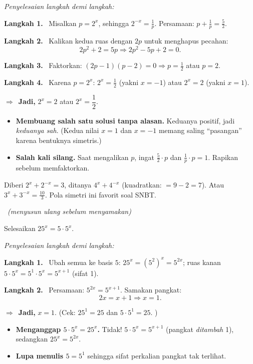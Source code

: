 \documentclass[11pt,a4paper]{report}
\theoremstyle{gaya}
\newcommand{\jawab}{\par\smallskip\noindent\textit{\textcolor{oranye}{Penyelesaian langkah demi langkah:}}\par\smallskip}
\newcommand{\langkah}[1]{\par\smallskip\noindent\textbf{\textcolor{biru}{Langkah #1.}}\ }
\newcommand{\jadi}{\par\smallskip\noindent$\Rightarrow$\ \textbf{Jadi, }}
\newcommand{\soalno}[2]{%
  \par\bigskip
  \noindent{\large\bfseries\color{ungu}\rule[-2pt]{4pt}{14pt}\ Soal #1}%
  \ {\normalfont\itshape\color{gray}(#2)}\par\nopagebreak\smallskip}
\begin{document}
\jawab
\langkah{1} Misalkan $p=2^x$, sehingga $2^{-x}=\tfrac1p$. Persamaan:
$p+\tfrac1p = \tfrac52$.
\langkah{2} Kalikan kedua ruas dengan $2p$ untuk menghapus pecahan:
\[
2p^2 + 2 = 5p \Rightarrow 2p^2 - 5p + 2 = 0.
\]
\langkah{3} Faktorkan: $(2p-1)(p-2)=0 \Rightarrow p=\tfrac12$ atau $p=2$.
\langkah{4} Karena $p=2^x$: $2^x=\tfrac12$ (yakni $x=-1$) atau $2^x=2$ (yakni
$x=1$).
\jadi $2^x = 2$ atau $2^x=\dfrac12$.

\begin{jebakan}
\begin{itemize}[leftmargin=*,topsep=2pt]
  \item \textbf{Membuang salah satu solusi tanpa alasan.} Keduanya positif, jadi
  \emph{keduanya sah}. (Kedua nilai $x=1$ dan $x=-1$ memang saling ``pasangan''
  karena bentuknya simetris.)
  \item \textbf{Salah kali silang.} Saat mengalikan $p$, ingat $\frac52\cdot p$
  dan $\frac1p\cdot p=1$. Rapikan sebelum memfaktorkan.
\end{itemize}
\end{jebakan}

\begin{variasi}
Diberi $2^x+2^{-x}=3$, ditanya $4^x+4^{-x}$ (kuadratkan: $=9-2=7$). Atau
$3^x+3^{-x}=\frac{10}{3}$. Pola simetri ini favorit soal SNBT.
\end{variasi}

\soalno{1.2.9}{menyusun ulang sebelum menyamakan}
\begin{soalbox}{}
Selesaikan $25^{x} = 5\cdot 5^{x}$.
\end{soalbox}

\jawab
\langkah{1} Ubah semua ke basis $5$: $25^x=(5^2)^x=5^{2x}$; ruas kanan
$5\cdot5^x = 5^{1}\cdot5^{x} = 5^{x+1}$ (sifat 1).
\langkah{2} Persamaan: $5^{2x} = 5^{x+1}$. Samakan pangkat:
\[
2x = x+1 \Rightarrow x = 1.
\]
\jadi $x=1$. (Cek: $25^1=25$ dan $5\cdot5^1=25$. \checkmark)

\begin{jebakan}
\begin{itemize}[leftmargin=*,topsep=2pt]
  \item \textbf{Menganggap $5\cdot5^x = 25^x$.} Tidak! $5\cdot5^x=5^{x+1}$
  (pangkat \emph{ditambah} 1), sedangkan $25^x=5^{2x}$.
  \item \textbf{Lupa menulis $5=5^1$} sehingga sifat perkalian pangkat tak
  terlihat.
\end{itemize}
\end{jebakan}
\end{document}
